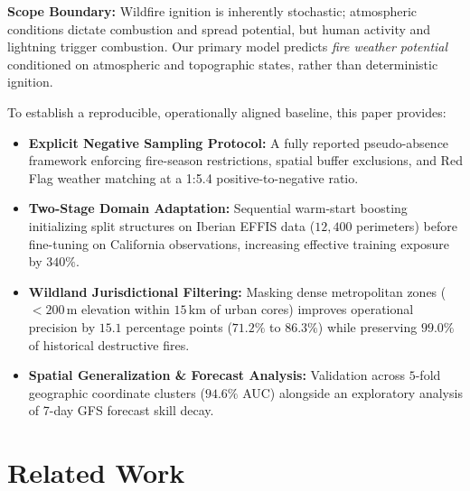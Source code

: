 \documentclass[journal]{IEEEtran}
\begin{document}
\noindent\textbf{\color{Burgundy}Scope Boundary:} Wildfire ignition is inherently stochastic; atmospheric conditions dictate combustion and spread potential, but human activity and lightning trigger combustion. Our primary model predicts \emph{fire weather potential} conditioned on atmospheric and topographic states, rather than deterministic ignition.

To establish a reproducible, operationally aligned baseline, this paper provides:
\begin{itemize}
    \item \textbf{\color{Maroon}Explicit Negative Sampling Protocol:} A fully reported pseudo-absence framework enforcing fire-season restrictions, spatial buffer exclusions, and Red Flag weather matching at a 1:5.4 positive-to-negative ratio.
    \item \textbf{\color{Maroon}Two-Stage Domain Adaptation:} Sequential warm-start boosting initializing split structures on Iberian EFFIS data ($12,400$ perimeters) before fine-tuning on California observations, increasing effective training exposure by $340\%$.
    \item \textbf{\color{Maroon}Wildland Jurisdictional Filtering:} Masking dense metropolitan zones ($<200\,\text{m}$ elevation within $15\,\text{km}$ of urban cores) improves operational precision by $15.1$ percentage points ($71.2\%$ to $86.3\%$) while preserving $99.0\%$ of historical destructive fires.
    \item \textbf{\color{Maroon}Spatial Generalization \& Forecast Analysis:} Validation across $5$-fold geographic coordinate clusters ($94.6\%$ AUC) alongside an exploratory analysis of 7-day GFS forecast skill decay.
\end{itemize}

\section{Related Work}
\end{document}
